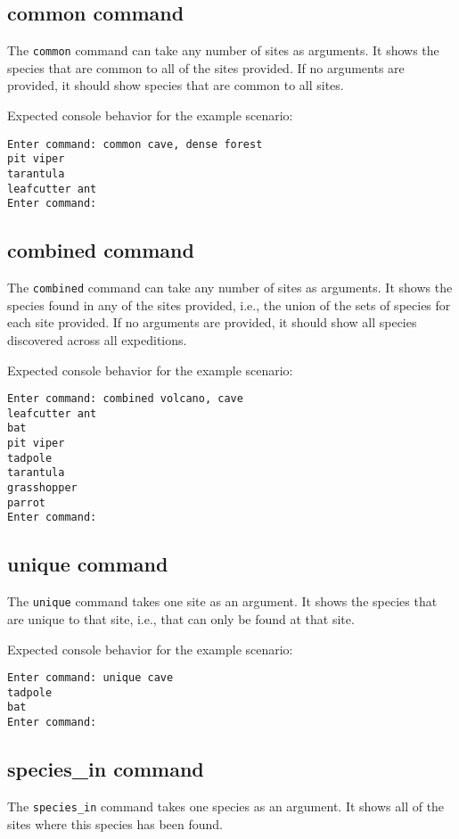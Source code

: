 \documentclass[12pt,letterpaper]{article}
\begin{document}
\subsection{common command}
The \texttt{common} command can take any number of sites as arguments. It shows the species that are common to all of the sites provided. If no arguments are provided, it should show species that are common to all sites.

Expected console behavior for the example scenario:
\begin{lstlisting}
Enter command: common cave, dense forest
pit viper
tarantula
leafcutter ant
Enter command: 
\end{lstlisting}

\subsection{combined command}
The \texttt{combined} command can take any number of sites as arguments. It shows the species found in any of the sites provided, i.e., the union of the sets of species for each site provided. If no arguments are provided, it should show all species discovered across all expeditions.

Expected console behavior for the example scenario:
\begin{lstlisting}
Enter command: combined volcano, cave
leafcutter ant
bat
pit viper
tadpole
tarantula
grasshopper
parrot
Enter command: 
\end{lstlisting}

\subsection{unique command}
The \texttt{unique} command takes one site as an argument. It shows the species that are unique to that site, i.e., that can only be found at that site.

Expected console behavior for the example scenario:
\begin{lstlisting}
Enter command: unique cave
tadpole
bat
Enter command: 
\end{lstlisting}

\subsection{species\_in command}
The \texttt{species\_in} command takes one species as an argument. It shows all of the sites where this species has been found.
\end{document}
